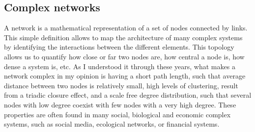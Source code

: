 \subsection{\label{subsec:Complex networks} Complex networks}
A network is a mathematical representation of a set of nodes connected by links. This simple definition allows to map the architecture of many complex systems by identifying the interactions between the different elements. This topology allows us to quantify how close or far two nodes are, how central a node is, how dense a system is, etc. As I understood it through these years,  what makes a network complex in my opinion is having a short path length, such that average distance between two nodes is relatively small, high levels of clustering, result from a triadic closure effect, and a scale free degree distribution, such that several nodes with low degree coexist with few nodes with a very high degree. These properties are often found in many social, biological and economic complex systems, such as social media, ecological networks, or financial systems.

